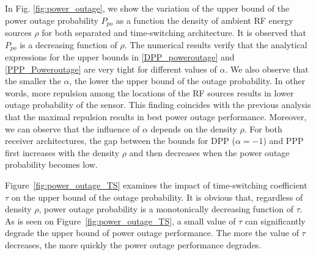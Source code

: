 \documentclass[12pt,draftclsnofoot,onecolumn]{IEEEtran}
\begin{document}
In Fig. \ref{fig:power_outage}, we show the variation of the upper bound of the power outage probability $P_{po}$ as a function the density of ambient RF energy sources $\rho$ for both separated and time-switching architecture. It is observed that $P_{po}$ is a decreasing function of $\rho$. 
The numerical results verify that the analytical expressions for the upper bounds in \eqref{DPP_poweroutage} and \eqref{PPP_Poweroutage} are very tight for different values of $\alpha$. We also observe that the smaller the $\alpha$, the lower the upper bound of the outage probability. In other words, more repulsion among the locations of the RF sources results in lower outage probability of the sensor. This finding coincides with the previous analysis that the maximal repulsion results in best power outage performance. 
Moreover, we can observe that the influence of $\alpha$ depends on the density $\rho$. For both receiver architectures, the gap between the bounds for DPP ($\alpha=-1$) and PPP first increases with the density $\rho$ and then decreases when the power outage probability becomes low.

Figure~\ref{fig:power_outage_TS} examines the impact of time-switching coefficient $\tau$ on the upper bound of the outage probability. It is obvious that, regardless of density $\rho$, power outage probability is a monotonically decreasing function of $\tau$. 
As is seen on Figure~\ref{fig:power_outage_TS}, a small value of $\tau$ can significantly degrade the upper bound of power outage performance. The more the value of $\tau$ decreases, the more quickly the power outage performance degrades.  
\end{document}
